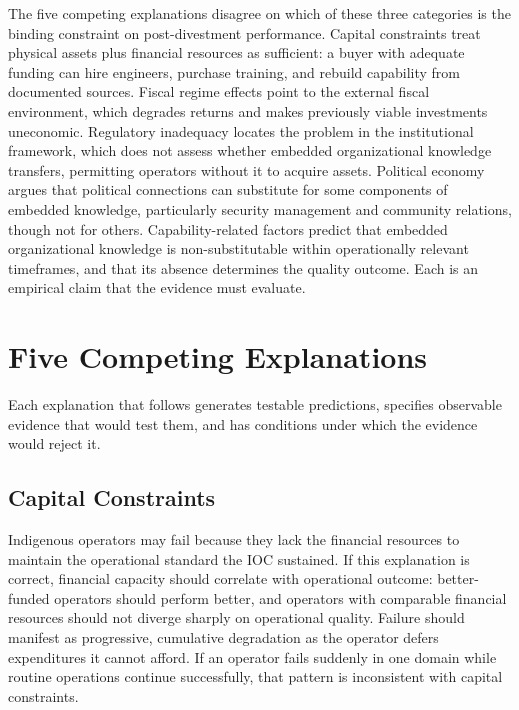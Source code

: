 \documentclass[twoside,fontset=lmodern]{mitthesis}
\begin{document}
The five competing explanations disagree on which of these three
categories is the binding constraint on post-divestment performance.
Capital constraints treat physical assets plus financial resources as
sufficient: a buyer with adequate funding can hire engineers, purchase
training, and rebuild capability from documented sources. Fiscal regime
effects point to the external fiscal environment, which degrades returns
and makes previously viable investments uneconomic. Regulatory
inadequacy locates the problem in the institutional framework, which
does not assess whether embedded organizational knowledge transfers,
permitting operators without it to acquire assets. Political economy
argues that political connections can substitute for some components of
embedded knowledge, particularly security management and community
relations, though not for others. Capability-related factors predict
that embedded organizational knowledge is non-substitutable within
operationally relevant timeframes, and that its absence determines the
quality outcome. Each is an empirical claim that the evidence must
evaluate.

\hypertarget{five-competing-explanations}{%
\section{Five Competing
Explanations}\label{five-competing-explanations}}

Each explanation that follows generates testable predictions, specifies
observable evidence that would test them, and has conditions under which
the evidence would reject it.

\hypertarget{capital-constraints}{%
\subsection{Capital Constraints}\label{capital-constraints}}

Indigenous operators may fail because they lack the financial resources
to maintain the operational standard the IOC sustained. If this
explanation is correct, financial capacity should correlate with
operational outcome: better-funded operators should perform better, and
operators with comparable financial resources should not diverge sharply
on operational quality. Failure should manifest as progressive,
cumulative degradation as the operator defers expenditures it cannot
afford. If an operator fails suddenly in one domain while routine
operations continue successfully, that pattern is inconsistent with
capital constraints.
\end{document}
